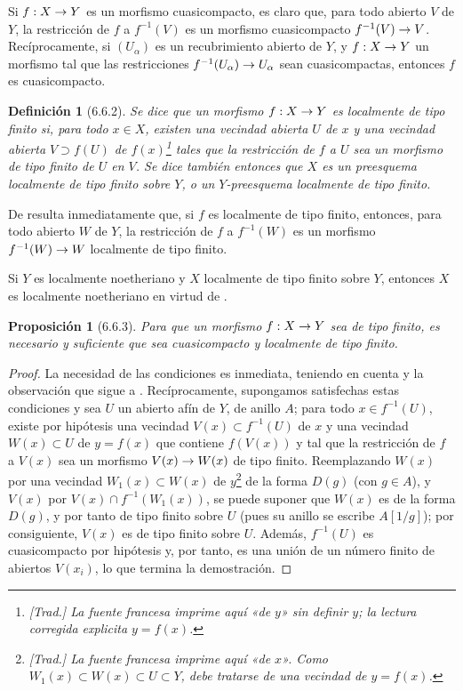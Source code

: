 \documentclass[oneside]{amsart}
\theoremstyle{ega-env-style}
\theoremstyle{ega-thm-env-style}
\newtheorem*{proposition}{Proposición}
\theoremstyle{ega-defn-env-style}
\newtheorem*{definition}{Definición}
\renewcommand{\to}{\mathchoice{\longrightarrow}{\rightarrow}{\rightarrow}{\rightarrow}}
\newcommand{\oldpage}[2][]{{\marginnote{\normalfont{\textbf{#1}~|~#2}}}\ignorespaces}
\let\EGAOriginalLabel\label
\renewcommand{\label}[1]{\phantomsection\EGAOriginalLabel{#1}}
\begin{document}
Si $f:X\to Y$ es un morfismo cuasicompacto, es claro que, para todo abierto $V$ de $Y$, la restricción de $f$ a $f^{-1}(V)$ es un morfismo cuasicompacto $f^{-1}(V)\to V$.
Recíprocamente, si $(U_\alpha)$ es un recubrimiento abierto de $Y$, y $f:X\to Y$ un morfismo tal que las restricciones $f^{-1}(U_\alpha)\to U_\alpha$ sean cuasicompactas, entonces $f$ es cuasicompacto.

\begin{definition}[6.6.2]
\label{I.6.6.2}
{\itshape Se dice que un morfismo $f:X\to Y$ es localmente de tipo finito si, para todo $x\in X$, existen una vecindad abierta $U$ de $x$ y una vecindad abierta $V\supset f(U)$ de $f(x)$\footnote{\emph{[Trad.] La fuente francesa imprime aquí «de $y$» sin definir $y$; la lectura corregida explicita $y=f(x)$.}} tales que la
\oldpage[I]{153}
restricción de $f$ a $U$ sea un morfismo de tipo finito de $U$ en $V$.
Se dice también entonces que $X$ es un preesquema localmente de tipo finito sobre $Y$, o un $Y$-preesquema localmente de tipo finito.}
\end{definition}

De  resulta inmediatamente que, si $f$ es localmente de tipo finito, entonces, para todo abierto $W$ de $Y$, la restricción de $f$ a $f^{-1}(W)$ es un morfismo $f^{-1}(W)\to W$ localmente de tipo finito.

Si $Y$ es localmente noetheriano y $X$ localmente de tipo finito sobre $Y$, entonces $X$ es localmente noetheriano en virtud de .

\begin{proposition}[6.6.3]
\label{I.6.6.3}
Para que un morfismo $f:X\to Y$ sea de tipo finito, es necesario y suficiente que sea cuasicompacto y localmente de tipo finito.
\end{proposition}

\begin{proof}
La necesidad de las condiciones es inmediata, teniendo en cuenta  y la observación que sigue a .
Recíprocamente, supongamos satisfechas estas condiciones y sea $U$ un abierto afín de $Y$, de anillo $A$;
para todo $x\in f^{-1}(U)$, existe por hipótesis una vecindad $V(x)\subset f^{-1}(U)$ de $x$ y una vecindad $W(x)\subset U$ de $y=f(x)$ que contiene $f(V(x))$ y tal que la restricción de $f$ a $V(x)$ sea un morfismo $V(x)\to W(x)$ de tipo finito.
Reemplazando $W(x)$ por una vecindad $W_1(x)\subset W(x)$ de $y$\footnote{\emph{[Trad.] La fuente francesa imprime aquí «de $x$». Como $W_1(x)\subset W(x)\subset U\subset Y$, debe tratarse de una vecindad de $y=f(x)$.}} de la forma $D(g)$ (con $g\in A$), y $V(x)$ por $V(x)\cap f^{-1}(W_1(x))$, se puede suponer que $W(x)$ es de la forma $D(g)$, y por tanto de tipo finito sobre $U$ (pues su anillo se escribe $A[1/g]$);
por consiguiente, $V(x)$ es de tipo finito sobre $U$.
Además, $f^{-1}(U)$ es cuasicompacto por hipótesis y, por tanto, es una unión de un número finito de abiertos $V(x_i)$, lo que termina la demostración.
\end{proof}
\end{document}
